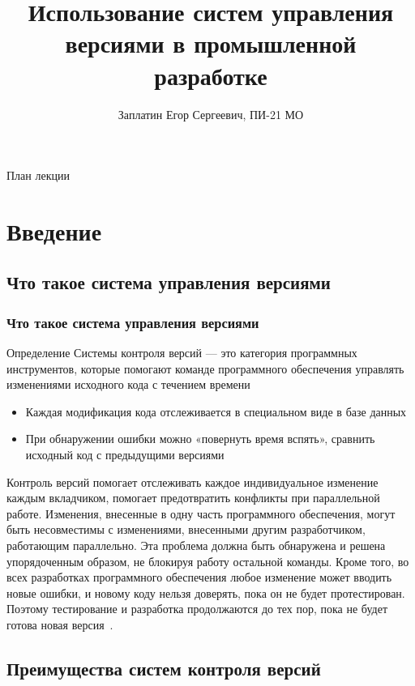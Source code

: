 \documentclass{../industrial-development}
\title{Использование систем управления версиями в промышленной разработке}
\author{Заплатин Егор Сергеевич, ПИ-21 МО}
\date{}
\begin{document}
\begin{frame}
  \titlepage
\end{frame}

\begin{frame}{План лекции}
  \tableofcontents
\end{frame}

\section{Введение}

\subsection{Что такое система управления версиями}

\begin{frame} \frametitle{Что такое система управления версиями}
  \begin{block}{Определение}
    \alert{Системы контроля версий} --- это категория программных инструментов, которые помогают команде программного обеспечения управлять изменениями исходного кода с течением времени
  \end{block}
  
  \begin{itemize}
  \item Каждая модификация кода отслеживается в специальном виде в базе данных
  \item При обнаружении ошибки можно «повернуть время вспять», сравнить исходный код с предыдущими версиями
  \end{itemize}
\end{frame}

\lecturenotes

Контроль версий помогает отслеживать каждое индивидуальное изменение каждым вкладчиком, помогает предотвратить конфликты при параллельной работе. Изменения, внесенные в одну часть программного обеспечения, могут быть несовместимы с изменениями, внесенными другим разработчиком, работающим параллельно. Эта проблема должна быть обнаружена и решена упорядоченным образом, не блокируя работу остальной команды. Кроме того, во всех разработках программного обеспечения любое изменение может вводить новые ошибки, и новому коду нельзя доверять, пока он не будет протестирован. Поэтому тестирование и разработка продолжаются до тех пор, пока не будет готова новая версия~\cite{Atlassian}.

\subsection{Преимущества систем контроля версий}
\end{document}
